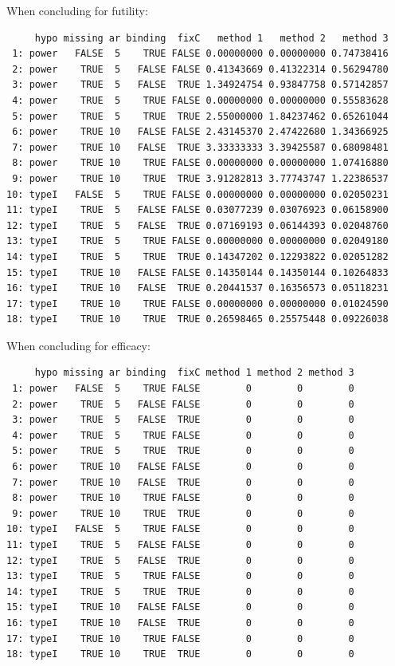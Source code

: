 \documentclass[12pt]{article}
\begin{document}
When concluding for futility:
\begin{verbatim}
     hypo missing ar binding  fixC   method 1   method 2   method 3
 1: power   FALSE  5    TRUE FALSE 0.00000000 0.00000000 0.74738416
 2: power    TRUE  5   FALSE FALSE 0.41343669 0.41322314 0.56294780
 3: power    TRUE  5   FALSE  TRUE 1.34924754 0.93847758 0.57142857
 4: power    TRUE  5    TRUE FALSE 0.00000000 0.00000000 0.55583628
 5: power    TRUE  5    TRUE  TRUE 2.55000000 1.84237462 0.65261044
 6: power    TRUE 10   FALSE FALSE 2.43145370 2.47422680 1.34366925
 7: power    TRUE 10   FALSE  TRUE 3.33333333 3.39425587 0.68098481
 8: power    TRUE 10    TRUE FALSE 0.00000000 0.00000000 1.07416880
 9: power    TRUE 10    TRUE  TRUE 3.91282813 3.77743747 1.22386537
10: typeI   FALSE  5    TRUE FALSE 0.00000000 0.00000000 0.02050231
11: typeI    TRUE  5   FALSE FALSE 0.03077239 0.03076923 0.06158900
12: typeI    TRUE  5   FALSE  TRUE 0.07169193 0.06144393 0.02048760
13: typeI    TRUE  5    TRUE FALSE 0.00000000 0.00000000 0.02049180
14: typeI    TRUE  5    TRUE  TRUE 0.14347202 0.12293822 0.02051282
15: typeI    TRUE 10   FALSE FALSE 0.14350144 0.14350144 0.10264833
16: typeI    TRUE 10   FALSE  TRUE 0.20441537 0.16356573 0.05118231
17: typeI    TRUE 10    TRUE FALSE 0.00000000 0.00000000 0.01024590
18: typeI    TRUE 10    TRUE  TRUE 0.26598465 0.25575448 0.09226038
\end{verbatim}

When concluding for efficacy:
\begin{verbatim}
     hypo missing ar binding  fixC method 1 method 2 method 3
 1: power   FALSE  5    TRUE FALSE        0        0        0
 2: power    TRUE  5   FALSE FALSE        0        0        0
 3: power    TRUE  5   FALSE  TRUE        0        0        0
 4: power    TRUE  5    TRUE FALSE        0        0        0
 5: power    TRUE  5    TRUE  TRUE        0        0        0
 6: power    TRUE 10   FALSE FALSE        0        0        0
 7: power    TRUE 10   FALSE  TRUE        0        0        0
 8: power    TRUE 10    TRUE FALSE        0        0        0
 9: power    TRUE 10    TRUE  TRUE        0        0        0
10: typeI   FALSE  5    TRUE FALSE        0        0        0
11: typeI    TRUE  5   FALSE FALSE        0        0        0
12: typeI    TRUE  5   FALSE  TRUE        0        0        0
13: typeI    TRUE  5    TRUE FALSE        0        0        0
14: typeI    TRUE  5    TRUE  TRUE        0        0        0
15: typeI    TRUE 10   FALSE FALSE        0        0        0
16: typeI    TRUE 10   FALSE  TRUE        0        0        0
17: typeI    TRUE 10    TRUE FALSE        0        0        0
18: typeI    TRUE 10    TRUE  TRUE        0        0        0
\end{verbatim}
\end{document}
